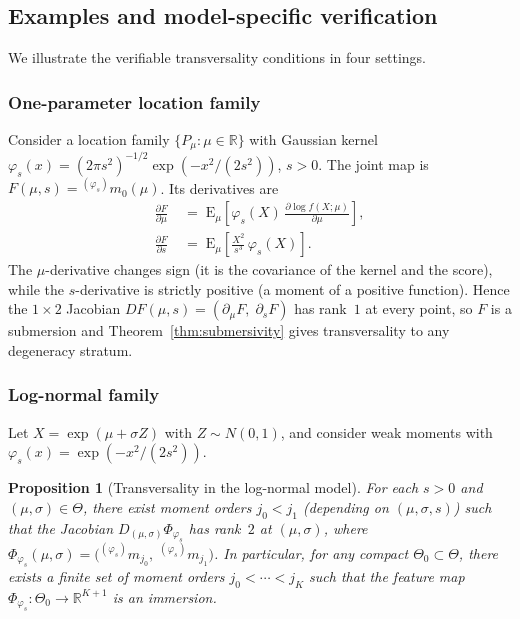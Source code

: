 \documentclass[11pt,a4paper]{article}
\newtheorem{proposition}[theorem]{Proposition}
\newcommand{\E}{\mathrm{E}}
\newcommand{\R}{\mathbb{R}}
\begin{document}
\subsection{Examples and model-specific verification}

We illustrate the verifiable transversality conditions in four
settings.

\subsubsection{One-parameter location family}

Consider a location family $\{P_\mu : \mu \in \R\}$ with Gaussian
kernel $\varphi_s(x) = (2\pi s^2)^{-1/2}\exp(-x^2/(2s^2))$,
$s > 0$.  The joint map is
$F(\mu,s) = {}^{(\varphi_s)}m_0(\mu)$.  Its derivatives are
\begin{align*}
  \frac{\partial F}{\partial \mu}
  &\;=\;
  \E_\mu\!\left[\varphi_s(X)\,
  \frac{\partial \log f(X;\mu)}{\partial\mu}\right],
  \\[4pt]
  \frac{\partial F}{\partial s}
  &\;=\;
  \E_\mu\!\left[\frac{X^2}{s^3}\,\varphi_s(X)\right].
\end{align*}
The $\mu$-derivative changes sign (it is the covariance of the
kernel and the score), while the $s$-derivative is strictly positive
(a moment of a positive function).  Hence the $1\times 2$ Jacobian
$DF(\mu,s) = (\partial_\mu F,\;\partial_s F)$ has rank~$1$ at every
point, so $F$ is a submersion and
Theorem~\ref{thm:submersivity} gives transversality to any
degeneracy stratum.

\subsubsection{Log-normal family}

Let $X = \exp(\mu + \sigma Z)$ with $Z \sim N(0,1)$, and consider
weak moments with $\varphi_s(x) = \exp(-x^2/(2s^2))$.

\begin{proposition}[Transversality in the log-normal model]
\label{prop:lognormal_transversality}
For each $s > 0$ and $(\mu,\sigma) \in \Theta$, there exist moment
orders $j_0 < j_1$ (depending on $(\mu,\sigma,s)$) such that the
Jacobian $D_{(\mu,\sigma)}\Phi_{\varphi_s}$ has rank~$2$ at
$(\mu,\sigma)$, where
$\Phi_{\varphi_s}(\mu,\sigma) =
\bigl({}^{(\varphi_s)}m_{j_0},\; {}^{(\varphi_s)}m_{j_1}\bigr)$.
In particular, for any compact $\Theta_0 \subset \Theta$, there
exists a finite set of moment orders $j_0 < \cdots < j_K$ such that
the feature map
$\Phi_{\varphi_s} : \Theta_0 \to \R^{K+1}$ is an immersion.
\end{proposition}
\end{document}
